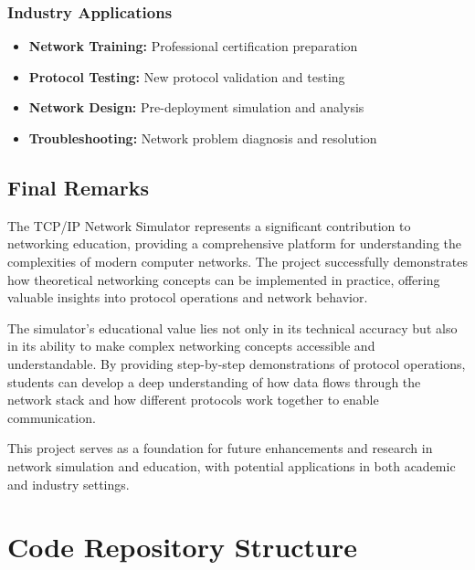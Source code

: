 \documentclass[12pt,a4paper]{article}
\begin{document}
\subsubsection{Industry Applications}

\begin{itemize}
\item \textbf{Network Training:} Professional certification preparation
\item \textbf{Protocol Testing:} New protocol validation and testing
\item \textbf{Network Design:} Pre-deployment simulation and analysis
\item \textbf{Troubleshooting:} Network problem diagnosis and resolution
\end{itemize}

\subsection{Final Remarks}

The TCP/IP Network Simulator represents a significant contribution to networking education, providing a comprehensive platform for understanding the complexities of modern computer networks. The project successfully demonstrates how theoretical networking concepts can be implemented in practice, offering valuable insights into protocol operations and network behavior.

The simulator's educational value lies not only in its technical accuracy but also in its ability to make complex networking concepts accessible and understandable. By providing step-by-step demonstrations of protocol operations, students can develop a deep understanding of how data flows through the network stack and how different protocols work together to enable communication.

This project serves as a foundation for future enhancements and research in network simulation and education, with potential applications in both academic and industry settings.

\newpage

\appendix

\section{Code Repository Structure}
\end{document}
